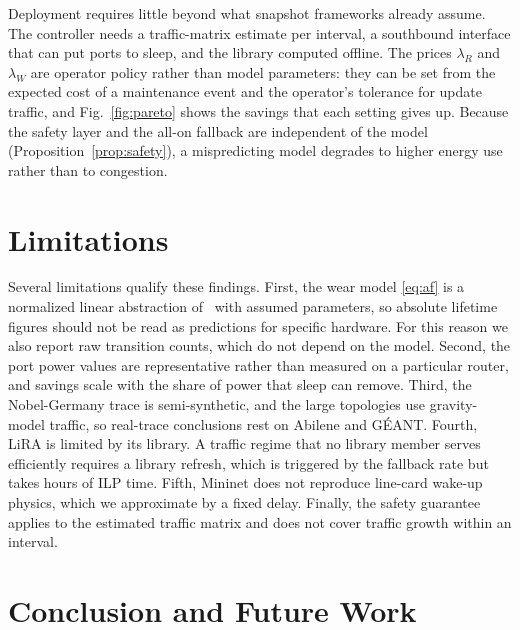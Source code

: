 \documentclass[conference]{IEEEtran}
\begin{document}
Deployment requires little beyond what snapshot frameworks already assume. The controller needs a traffic-matrix estimate per interval, a southbound interface that can put ports to sleep, and the library computed offline. The prices $\lambda_R$ and $\lambda_W$ are operator policy rather than model parameters: they can be set from the expected cost of a maintenance event and the operator's tolerance for update traffic, and Fig.~\ref{fig:pareto} shows the savings that each setting gives up. Because the safety layer and the all-on fallback are independent of the model (Proposition~\ref{prop:safety}), a mispredicting model degrades to higher energy use rather than to congestion.

\section{Limitations}\label{sec:limitations}

Several limitations qualify these findings. First, the wear model \eqref{eq:af} is a normalized linear abstraction of~\cite{chiaraviglio2015lifetime} with assumed parameters, so absolute lifetime figures should not be read as predictions for specific hardware. For this reason we also report raw transition counts, which do not depend on the model. Second, the port power values are representative rather than measured on a particular router, and savings scale with the share of power that sleep can remove. Third, the Nobel-Germany trace is semi-synthetic, and the large topologies use gravity-model traffic, so real-trace conclusions rest on Abilene and G\'{E}ANT. Fourth, LiRA is limited by its library. A traffic regime that no library member serves efficiently requires a library refresh, which is triggered by the fallback rate but takes hours of ILP time. Fifth, Mininet does not reproduce line-card wake-up physics, which we approximate by a fixed delay. Finally, the safety guarantee applies to the estimated traffic matrix and does not cover traffic growth within an interval.

\section{Conclusion and Future Work}\label{sec:conclusion}
\end{document}

